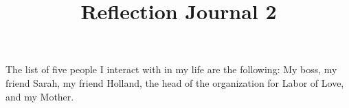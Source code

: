 \documentclass[12pt]{article}
\begin{document}
\title{Reflection Journal 2}
\par
The list of five people I interact with in my life are the following: My boss, my friend Sarah, my friend Holland, the head of the organization for Labor of Love, and my Mother.
\end{document}
